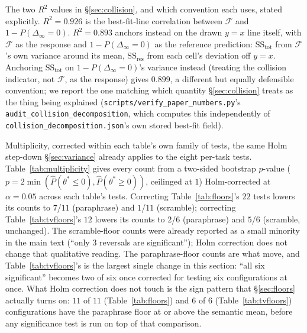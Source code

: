 The two $R^2$ values in \S\ref{sec:collision}, and which convention each uses, stated explicitly. $R^2{=}0.926$ is the best-fit-line correlation between $\mathcal{F}$ and $1{-}P(\Delta_\infty{=}0)$. $R^2{=}0.893$ anchors instead on the drawn $y{=}x$ line itself, with $\mathcal{F}$ as the response and $1{-}P(\Delta_\infty{=}0)$ as the reference prediction: $\text{SS}_{\text{tot}}$ from $\mathcal{F}$'s own variance around its mean, $\text{SS}_{\text{res}}$ from each cell's deviation off $y{=}x$. Anchoring $\text{SS}_{\text{tot}}$ on $1{-}P(\Delta_\infty{=}0)$'s variance instead (treating the collision indicator, not $\mathcal{F}$, as the response) gives $0.899$, a different but equally defensible convention; we report the one matching which quantity \S\ref{sec:collision} treats as the thing being explained (\texttt{scripts/\allowbreak{}verify\_paper\_numbers.py}'s \texttt{audit\_\allowbreak{}collision\_decomposition}, which computes this independently of \texttt{collision\_\allowbreak{}decomposition.json}'s own stored best-fit field).

Multiplicity, corrected within each table's own family of tests, the same Holm step-down \S\ref{sec:variance} already applies to the eight per-task tests. Table~\ref{tab:multiplicity} gives every count from a two-sided bootstrap $p$-value ($p = 2\min(\hat P(\theta^{*}{\le}0), \hat P(\theta^{*}{\ge}0))$, ceilinged at $1$) Holm-corrected at $\alpha{=}0.05$ across each table's tests. Correcting Table~\ref{tab:floors}'s $22$ tests lowers its counts to $7$/$11$ (paraphrase) and $1$/$11$ (scramble); correcting Table~\ref{tab:tvfloors}'s $12$ lowers its counts to $2$/$6$ (paraphrase) and $5$/$6$ (scramble, unchanged). The scramble-floor counts were already reported as a small minority in the main text (``only 3 reversals are significant''); Holm correction does not change that qualitative reading. The paraphrase-floor counts are what move, and Table~\ref{tab:tvfloors}'s is the largest single change in this section: ``all six significant'' becomes two of six once corrected for testing six configurations at once. What Holm correction does not touch is the sign pattern that \S\ref{sec:floors} actually turns on: $11$ of $11$ (Table~\ref{tab:floors}) and $6$ of $6$ (Table~\ref{tab:tvfloors}) configurations have the paraphrase floor at or above the semantic mean, before any significance test is run on top of that comparison.

